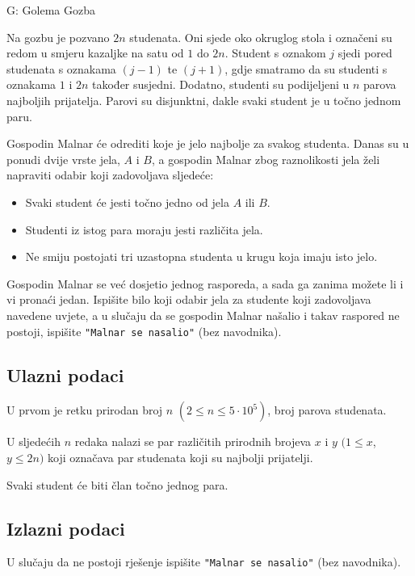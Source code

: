 \begin{statement}[
  timelimit=1 s,
  memorylimit=512 MiB,
]{G: Golema Gozba}

Na gozbu je pozvano $2n$ studenata. Oni sjede oko okruglog stola i označeni su
redom u smjeru kazaljke na satu od $1$ do $2n$. Student s oznakom $j$ sjedi
pored studenata s oznakama $(j - 1)$ te $(j + 1)$, gdje smatramo da su studenti
s oznakama $1$ i $2n$ također susjedni. Dodatno, studenti su podijeljeni u $n$
parova najboljih prijatelja. Parovi su disjunktni, dakle svaki student je u
točno jednom paru.

Gospodin Malnar će odrediti koje je jelo najbolje za svakog studenta. Danas su
u ponudi dvije vrste jela, $A$ i $B$, a gospodin Malnar zbog raznolikosti jela
želi napraviti odabir koji zadovoljava sljedeće:
\begin{itemize}
    \item Svaki student će jesti točno jedno od jela $A$ ili $B$.
    \item Studenti iz istog para moraju jesti različita jela.
    \item Ne smiju postojati tri uzastopna studenta u krugu koja imaju isto jelo.
\end{itemize}

Gospodin Malnar se već dosjetio jednog rasporeda, a sada ga zanima možete li i
vi pronaći jedan. Ispišite bilo koji odabir jela za studente koji zadovoljava
navedene uvjete, a u slučaju da se gospodin Malnar našalio i takav raspored ne
postoji, ispišite \texttt{"Malnar se nasalio"} (bez navodnika).

\subsection*{Ulazni podaci}
U prvom je retku prirodan broj $n$ $(2 \le n \le 5 \cdot 10^5)$, broj parova
studenata.

U sljedećih $n$ redaka nalazi se par različitih prirodnih brojeva $x$ i $y$
$(1 \le x$, $y \le 2n)$ koji označava par studenata koji su najbolji prijatelji.

Svaki student će biti član točno jednog para.
\subsection*{Izlazni podaci}
U slučaju da ne postoji rješenje ispišite \texttt{"Malnar se nasalio"}
(bez navodnika).


\end{statement}
